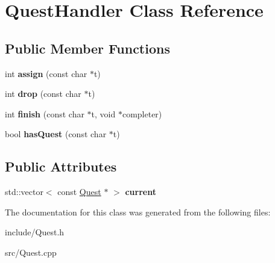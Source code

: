 \hypertarget{classQuestHandler}{}\section{Quest\+Handler Class Reference}
\label{classQuestHandler}
\subsection*{Public Member Functions}
\begin{DoxyCompactItemize}
\item 
\hypertarget{classQuestHandler_a61c30ef0a8f5d5fac0e7595f38f3701a}{}int {\bfseries assign} (const char $\ast$t)\label{classQuestHandler_a61c30ef0a8f5d5fac0e7595f38f3701a}

\item 
\hypertarget{classQuestHandler_afac46a727130210fef11a722dd69235f}{}int {\bfseries drop} (const char $\ast$t)\label{classQuestHandler_afac46a727130210fef11a722dd69235f}

\item 
\hypertarget{classQuestHandler_a0d9905701c9572a7d6337b83f7454d5f}{}int {\bfseries finish} (const char $\ast$t, void $\ast$completer)\label{classQuestHandler_a0d9905701c9572a7d6337b83f7454d5f}

\item 
\hypertarget{classQuestHandler_abea1135d393d5499f1bdc3d924c41825}{}bool {\bfseries has\+Quest} (const char $\ast$t)\label{classQuestHandler_abea1135d393d5499f1bdc3d924c41825}

\end{DoxyCompactItemize}
\subsection*{Public Attributes}
\begin{DoxyCompactItemize}
\item 
\hypertarget{classQuestHandler_a79966e1ba3decad47149fab057625e8e}{}std\+::vector$<$ const \hyperlink{classQuest}{Quest} $\ast$ $>$ {\bfseries current}\label{classQuestHandler_a79966e1ba3decad47149fab057625e8e}

\end{DoxyCompactItemize}


The documentation for this class was generated from the following files\+:\begin{DoxyCompactItemize}
\item 
include/Quest.\+h\item 
src/Quest.\+cpp\end{DoxyCompactItemize}
